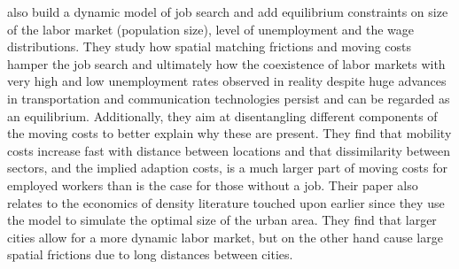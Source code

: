 \citet{Schmutz2015} also build a dynamic model of job search and add equilibrium constraints on size of the labor market (population size), level of unemployment and the wage distributions. They study how spatial matching frictions and moving costs hamper the job search and ultimately how the coexistence of labor markets with very high and low unemployment rates observed in reality despite huge advances in transportation and communication technologies persist and can be regarded as an equilibrium. Additionally, they aim at disentangling different components of the moving costs to better explain why these are present. They find that mobility costs increase fast with distance between locations and that dissimilarity between sectors, and the implied adaption costs, is a much larger part of moving costs for employed workers than is the case for those without a job. Their paper also relates to the economics of density literature touched upon earlier since they use the model to simulate the optimal size of the urban area. They find that larger cities allow for a more dynamic labor market, but on the other hand cause large spatial frictions due to long distances between cities. 

